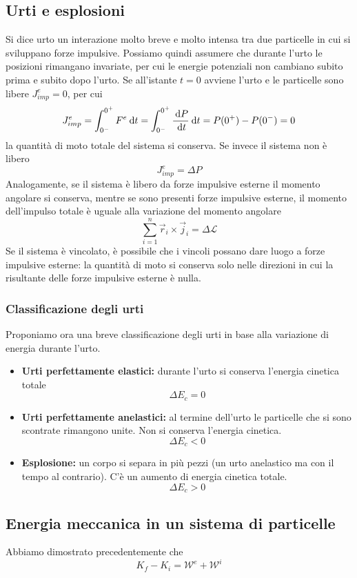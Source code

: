 \documentclass{article}
\theoremstyle{plain}
\begin{document}
\subsection{Urti e esplosioni}
Si dice urto un interazione molto breve e molto intensa tra due particelle in cui si sviluppano forze impulsive. 
Possiamo quindi assumere che durante l'urto le posizioni rimangano invariate, per cui le energie potenziali non cambiano subito prima e subito dopo l'urto.
Se all'istante $t=0$ avviene l'urto e le particelle sono libere $J_{imp}^e=0$, per cui
\[J_{imp}^e = \int_{0^ - }^{0^ + }F^e\:\text{d} t =\int_{0^ -}^{0^ +}\frac{\:\text{d} P}{\:\text{d} t} \:\text{d} t= P(0^ +) - P(0^ -) = 0\]
la quantità di moto totale del sistema si conserva. Se invece il sistema non è libero
\[J_{imp}^e =\Delta P\]
Analogamente, se il sistema è libero da forze impulsive esterne il momento angolare si conserva, mentre se sono presenti forze impulsive esterne, il momento dell'impulso totale è uguale alla variazione del momento angolare
\[\sum_{i = 1}^n\vec r_i \times \vec j_i = \Delta \mathcal L\]
Se il sistema è vincolato, è possibile che i vincoli possano dare luogo a forze impulsive esterne: la quantità di moto si conserva solo nelle direzioni in cui la risultante delle forze impulsive esterne è nulla.
\subsubsection{Classificazione degli urti}
Proponiamo ora una breve classificazione degli urti in base alla variazione di energia durante l'urto.
\begin{itemize}
    \item \textbf{Urti perfettamente elastici:} durante l'urto si conserva l'energia cinetica totale
    \[\Delta E_c = 0\]
    \item \textbf{Urti perfettamente anelastici:} al termine dell'urto le particelle che si sono scontrate rimangono unite. Non si conserva l'energia cinetica. \[\Delta E_c < 0\]
    \item \textbf{Esplosione:} un corpo si separa in più pezzi (un urto anelastico ma con il tempo al contrario). C'è un aumento di energia cinetica totale.
    \[\Delta E_c > 0\]
\end{itemize}
\subsection{Energia meccanica in un sistema di particelle}
Abbiamo dimostrato precedentemente che 
\[K_f - K_i = \mathcal W^e + \mathcal W^i\]
\end{document}
